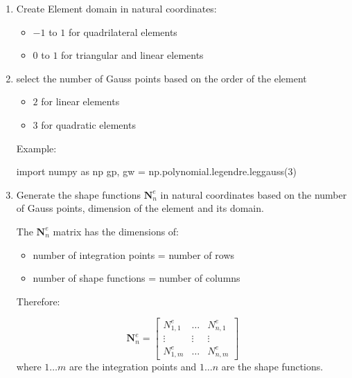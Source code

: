 \documentclass[10pt,b5paper,titlepage]{book}
\begin{document}
\begin{enumerate}
    \item Create Element domain in natural coordinates:
        \begin{itemize}
            \item $ -1 $ to $ 1 $ for quadrilateral elements
            \item $ 0 $ to $ 1 $ for triangular and linear elements
        \end{itemize}

    \item select the number of Gauss points based on the order of the element
        \begin{itemize}
            \item $ 2 $ for linear elements
            \item $ 3 $ for quadratic elements
        \end{itemize}

        Example:
        \begin{python}
import numpy as np
gp, gw = np.polynomial.legendre.leggauss(3)
        \end{python}

    \item Generate the shape functions $ \mathbf{N}_n^e $ in natural coordinates
        based on the number of Gauss points, dimension of the element and its domain.

        The $ \mathbf{N}_n^e $ matrix has the dimensions of:
        \begin{itemize}
            \item number of integration points = number of rows
            \item number of shape functions = number of columns
        \end{itemize}

        Therefore:

        \begin{equation}
            \mathbf{N}_n^e = \begin{bmatrix}
                N_{1,1}^e & \dots & N_{n,1}^e\\
                \vdots & \vdots & \vdots\\
                N_{1,m}^e & \dots & N_{n,m}^e
            \end{bmatrix}
        \end{equation}
         where $ 1 \dots m $ are the integration points and $ 1 \dots n $ are the shape
         functions.


\end{enumerate}
\end{document}
